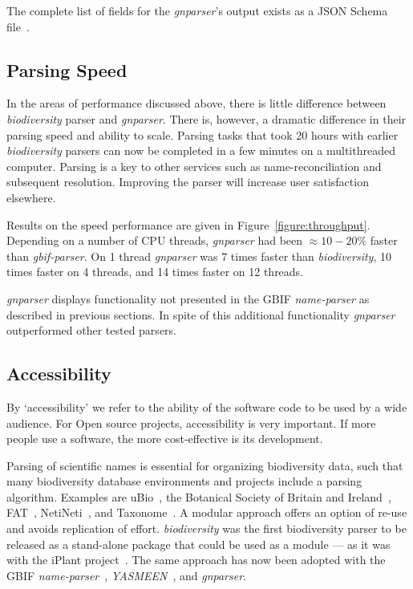 \documentclass{bmcart}
\begin{document}
The complete list of fields for the \textit{gnparser}'s output exists as a JSON Schema file~\cite{gnparser-json}.

\subsection*{Parsing Speed}

In the areas of performance discussed above, there is little difference between \textit{biodiversity} parser and \textit{gnparser}. There is, however, a dramatic difference in their parsing speed and ability to scale. Parsing tasks that took 20 hours with earlier \textit{biodiversity} parsers can now be completed in a few minutes on a multithreaded computer. Parsing is a key to other services such as name-reconciliation and subsequent resolution.  Improving the parser will increase user satisfaction elsewhere.

Results on the speed performance are given in Figure~\ref{figure:throughput}.  Depending on a number of CPU threads, \textit{gnparser} had been $\approx10-20\%$ faster than \textit{gbif-parser}. On 1 thread \textit{gnparser} was 7 times faster than \textit{biodiversity}, 10 times faster on 4 threads, and 14 times faster on 12 threads.

\textit{gnparser} displays functionality not presented in the GBIF \textit{name-parser} as described in previous sections. In spite of this additional functionality \textit{gnparser} outperformed other tested parsers.

\subsection*{Accessibility}

By `accessibility' we refer to the ability of the software code to be used by a wide audience. For Open source projects, accessibility is very important. If more people use a software, the more cost-effective is its development.

Parsing of scientific names is essential for organizing biodiversity data, such that many biodiversity database environments and projects include a parsing algorithm. Examples are uBio~\cite{ubio:parser}, the Botanical Society of Britain and Ireland~\cite{botsociety:parser}, FAT~\cite{Sautter2006}, NetiNeti~\cite{Akella2012}, and Taxonome~\cite{Kluyver2013}. A modular approach offers an option of re-use and avoids replication of effort. \textit{biodiversity} was the first biodiversity parser to be released as a stand-alone package that could be used as a module --- as it was with the iPlant project~\cite{Boyle2013}.  The same approach has now been adopted with the GBIF \textit{name-parser}~\cite{gbifNameParser}, \textit{YASMEEN}~\cite{VandenBerghe2015}, and \textit{gnparser}.
\end{document}
